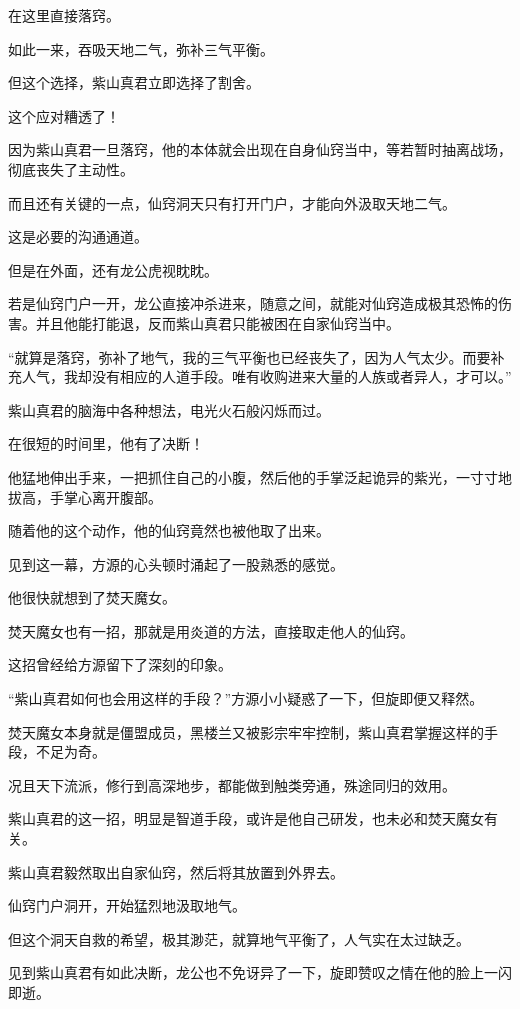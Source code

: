 \begin{this_body}
在这里直接落窍。

如此一来，吞吸天地二气，弥补三气平衡。

但这个选择，紫山真君立即选择了割舍。

这个应对糟透了！

因为紫山真君一旦落窍，他的本体就会出现在自身仙窍当中，等若暂时抽离战场，彻底丧失了主动性。

而且还有关键的一点，仙窍洞天只有打开门户，才能向外汲取天地二气。

这是必要的沟通通道。

但是在外面，还有龙公虎视眈眈。

若是仙窍门户一开，龙公直接冲杀进来，随意之间，就能对仙窍造成极其恐怖的伤害。并且他能打能退，反而紫山真君只能被困在自家仙窍当中。

“就算是落窍，弥补了地气，我的三气平衡也已经丧失了，因为人气太少。而要补充人气，我却没有相应的人道手段。唯有收购进来大量的人族或者异人，才可以。”

紫山真君的脑海中各种想法，电光火石般闪烁而过。

在很短的时间里，他有了决断！

他猛地伸出手来，一把抓住自己的小腹，然后他的手掌泛起诡异的紫光，一寸寸地拔高，手掌心离开腹部。

随着他的这个动作，他的仙窍竟然也被他取了出来。

见到这一幕，方源的心头顿时涌起了一股熟悉的感觉。

他很快就想到了焚天魔女。

焚天魔女也有一招，那就是用炎道的方法，直接取走他人的仙窍。

这招曾经给方源留下了深刻的印象。

“紫山真君如何也会用这样的手段？”方源小小疑惑了一下，但旋即便又释然。

焚天魔女本身就是僵盟成员，黑楼兰又被影宗牢牢控制，紫山真君掌握这样的手段，不足为奇。

况且天下流派，修行到高深地步，都能做到触类旁通，殊途同归的效用。

紫山真君的这一招，明显是智道手段，或许是他自己研发，也未必和焚天魔女有关。

紫山真君毅然取出自家仙窍，然后将其放置到外界去。

仙窍门户洞开，开始猛烈地汲取地气。

但这个洞天自救的希望，极其渺茫，就算地气平衡了，人气实在太过缺乏。

见到紫山真君有如此决断，龙公也不免讶异了一下，旋即赞叹之情在他的脸上一闪即逝。

\end{this_body}

